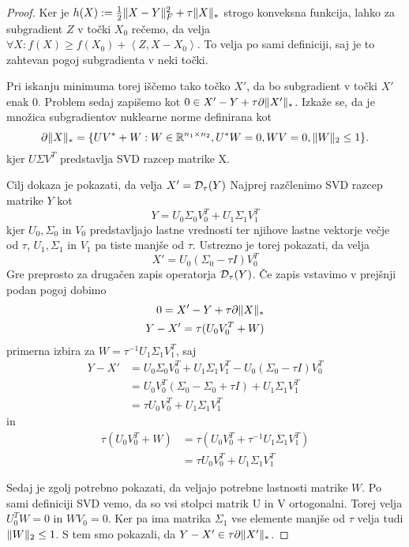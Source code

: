 \begin{proof}
Ker je $h(X) := \frac{1}{2} \lVert X-Y\rVert_F^2 + \tau\lVert X\rVert_* $ strogo konveksna funkcija, lahko za subgradient $Z$ v točki $X_0$ rečemo, da velja $\forall X: f(X) \geq  f(X_0) + \left< Z, X - X_0 \right>$.  To velja po sami definiciji, saj je to zahtevan pogoj subgradienta v neki točki.

Pri iskanju minimuma torej iščemo tako točko $X'$, da bo subgradient v točki $X'$ enak 0. Problem sedaj zapišemo kot $0 \in X' - Y + \tau \partial\lVert X'\rVert_*$. Izkaže se, da je množica subgradientov nuklearne norme definirana kot
\[
    \partial\lVert X\rVert_* = \{UV^* + W: W \in \mathbb{R}^{n_1 \times n_2}, U^*W = 0, WV = 0, \lVert W\rVert_2 \leq 1 \}.
\]
kjer $U \Sigma V^T$ predstavlja SVD razcep matrike X. \cite{CCS}

Cilj dokaza je pokazati, da velja $X' = \mathcal{D}_\tau(Y)$ Najprej razčlenimo SVD razcep matrike $Y$ kot 
\[
    Y = U_0\Sigma_0V_0^T + U_1\Sigma_1V_1^T
\]
kjer $U_0, \Sigma_0$ in $V_0$ predstavljajo lastne vrednosti ter njihove lastne vektorje večje od $\tau$, $U_1, \Sigma_1$ in $V_1$ pa tiste manjše od $\tau$. Ustrezno je torej pokazati, da velja 
\[
    X' = U_0(\Sigma_0 - \tau I)V_0^T
\] Gre preprosto za drugačen zapis operatorja $\mathcal{D}_\tau(Y)$.
Če zapis vstavimo v prejšnji podan pogoj dobimo
\begin{align*}
    0 = X' - Y + \tau \partial \lVert X\rVert_*\\
    Y- X' = \tau (U_0 V_0^T + W)
\end{align*}
primerna izbira za $W = \tau^{-1} U_1 \Sigma_1 V_1^T$, saj
\begin{align*}
    Y-X' &= U_0\Sigma_0V_0^T + U_1\Sigma_1V_1^T - U_0(\Sigma_0 - \tau I)V_0^T \\ 
    &= U_0V_0^T(\Sigma_0 - \Sigma_0 + \tau I) + U_1\Sigma_1 V_1^T  \\
    &= \tau U_0 V_0^T + U_1\Sigma_1 V_1^T
\end{align*}
in 
\begin{align*}
    \tau(U_0 V_0^T + W) &= \tau(U_0V_0^T + \tau^{-1} U_1 \Sigma_1 V_1^T)\\ 
    &= \tau U_0 V_0^T + U_1 \Sigma_1 V_1^T 
\end{align*}

Sedaj je zgolj potrebno pokazati, da veljajo potrebne lastnosti matrike $W$.
Po sami definiciji SVD vemo, da so vsi stolpci matrik U in V ortogonalni. Torej velja $U_0^TW = 0$ in $WV_0 = 0$. Ker pa ima matrika $\Sigma_1$ vse elemente manjše od $\tau$ velja tudi $\lVert W\rVert_2 \leq 1$. S tem smo pokazali, da $Y - X' \in \tau \partial \lVert X'\rVert_*$.
\end{proof}

